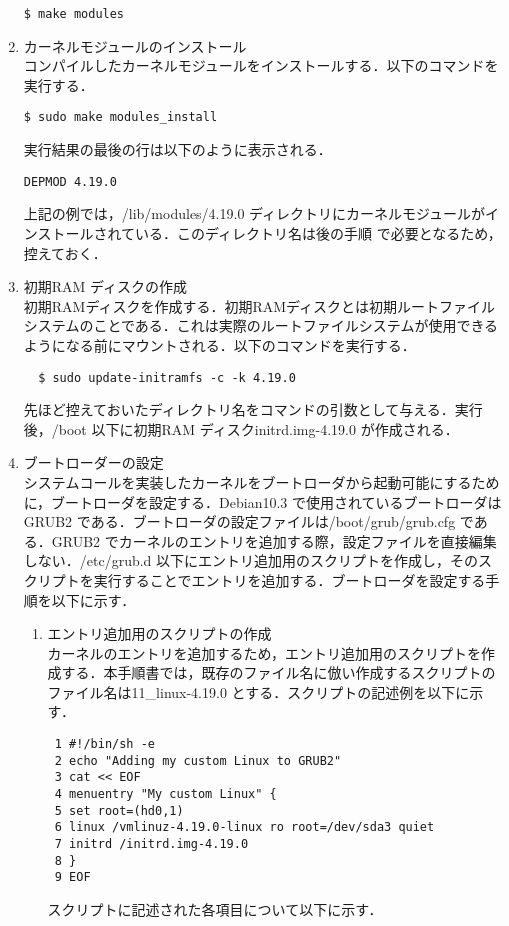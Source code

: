 \documentclass[12pt]{jsarticle}
\begin{document}
\begin{enumerate}
\begin{verbatim}
$ make modules
\end{verbatim}
\item カーネルモジュールのインストール\\
  コンパイルしたカーネルモジュールをインストールする．以下のコマンドを実行する．
\begin{verbatim}
$ sudo make modules_install
\end{verbatim}
実行結果の最後の行は以下のように表示される．
\begin{verbatim}
DEPMOD 4.19.0
\end{verbatim}
上記の例では，/lib/modules/4.19.0 ディレクトリにカーネルモジュールがインストールされている．このディレクトリ名は後の手順 で必要となるため，控えておく．
\item 初期RAM ディスクの作成\\
  初期RAMディスクを作成する．初期RAMディスクとは初期ルートファイルシステムのことである．これは実際のルートファイルシステムが使用できるようになる前にマウントされる．以下のコマンドを実行する．
\begin{verbatim}
  $ sudo update-initramfs -c -k 4.19.0
\end{verbatim}
先ほど控えておいたディレクトリ名をコマンドの引数として与える．実行後，/boot 以下に初期RAM ディスクinitrd.img-4.19.0 が作成される．
\item ブートローダーの設定\\
  システムコールを実装したカーネルをブートローダから起動可能にするために，ブートローダを設定する．Debian10.3 で使用されているブートローダはGRUB2 である．ブートローダの設定ファイルは/boot/grub/grub.cfg である．GRUB2 でカーネルのエントリを追加する際，設定ファイルを直接編集しない．/etc/grub.d 以下にエントリ追加用のスクリプトを作成し，そのスクリプトを実行することでエントリを追加する．ブートローダを設定する手順を以下に示す．
\begin{enumerate}
\item エントリ追加用のスクリプトの作成\\\label{sec:script}
  カーネルのエントリを追加するため，エントリ追加用のスクリプトを作成する．本手順書では，既存のファイル名に倣い作成するスクリプトのファイル名は11\_linux-4.19.0 とする．スクリプトの記述例を以下に示す．
\begin{verbatim}
 1 #!/bin/sh -e
 2 echo "Adding my custom Linux to GRUB2"
 3 cat << EOF
 4 menuentry "My custom Linux" {
 5 set root=(hd0,1)
 6 linux /vmlinuz-4.19.0-linux ro root=/dev/sda3 quiet
 7 initrd /initrd.img-4.19.0
 8 }
 9 EOF
\end{verbatim}
スクリプトに記述された各項目について以下に示す．


\end{enumerate}
\end{enumerate}
\end{document}
